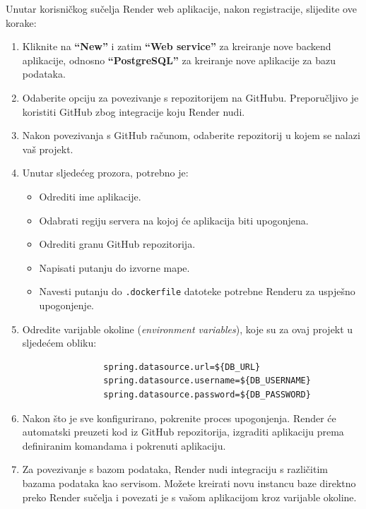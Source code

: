 		Unutar korisničkog sučelja Render web aplikacije, nakon registracije, slijedite ove korake:
		
		\begin{enumerate}
			\item Kliknite na \textbf{``New''} i zatim \textbf{``Web service''} za kreiranje nove backend aplikacije, odnosno \textbf{``PostgreSQL''} za kreiranje nove aplikacije za bazu podataka.
			
			\item Odaberite opciju za povezivanje s repozitorijem na GitHubu. Preporučljivo je koristiti GitHub zbog integracije koju Render nudi. 
			
			\item Nakon povezivanja s GitHub računom, odaberite repozitorij u kojem se nalazi vaš projekt.
			
			\item Unutar sljedećeg prozora, potrebno je:
			\begin{itemize}
				\item Odrediti ime aplikacije.
				\item Odabrati regiju servera na kojoj će aplikacija biti upogonjena.
				\item Odrediti granu GitHub repozitorija.
				\item Napisati putanju do izvorne mape.
				\item Navesti putanju do \texttt{.dockerfile} datoteke potrebne Renderu za uspješno upogonjenje.
			\end{itemize}
			
			\item Odredite varijable okoline (\textit{environment variables}), koje su za ovaj projekt u sljedećem obliku:
			\begin{verbatim}
				spring.datasource.url=${DB_URL}
				spring.datasource.username=${DB_USERNAME}
				spring.datasource.password=${DB_PASSWORD}
			\end{verbatim}
			
			\item Nakon što je sve konfigurirano, pokrenite proces upogonjenja. Render će automatski preuzeti kod iz GitHub repozitorija, izgraditi aplikaciju prema definiranim komandama i pokrenuti aplikaciju.
			
			\item Za povezivanje s bazom podataka, Render nudi integraciju s različitim bazama podataka kao servisom. Možete kreirati novu instancu baze direktno preko Render sučelja i povezati je s vašom aplikacijom kroz varijable okoline.
			

\end{enumerate}
